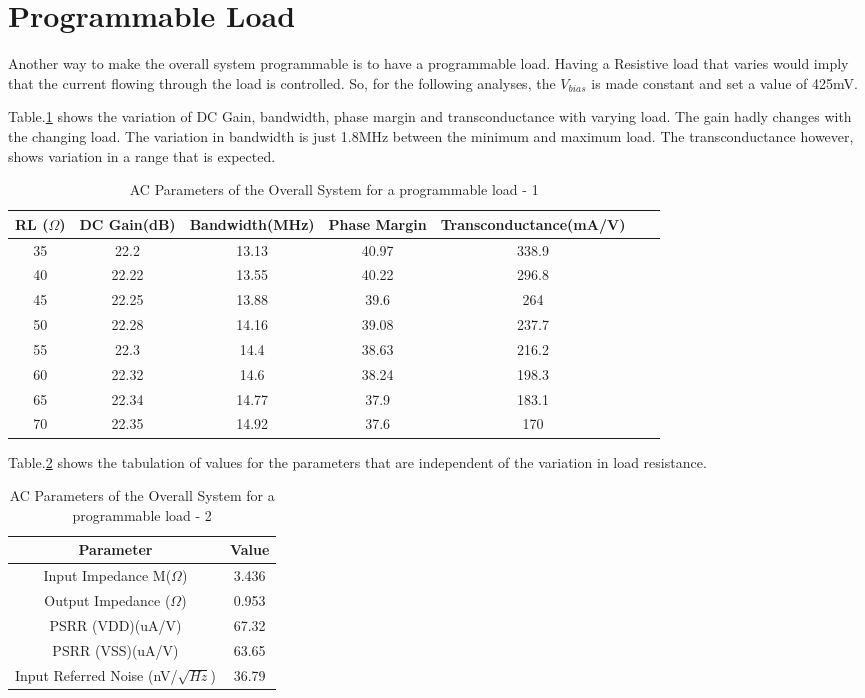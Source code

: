 \section{Programmable Load}
Another way to make the overall system programmable is to have a programmable load. Having a Resistive load that varies would imply that the current flowing through the load is controlled. So, for the following analyses, the $V_{bias}$ is made constant and set a value of 425mV.

Table.\ref{tab:RL_AC_1} shows the variation of DC Gain, bandwidth, phase margin and transconductance with varying load. The gain hadly changes with the changing load. The variation in bandwidth is just 1.8MHz between the minimum and maximum load. The transconductance however, shows variation in a range that is expected.
 
\begin{table} [H]
\centering
\begin{tabular}{@{}ccccccc@{}}
\toprule
RL ($\Omega$)		& DC Gain(dB)		& Bandwidth(MHz)		& Phase Margin			& Transconductance(mA/V)\\ \midrule
35		& 22.2 		& 13.13		& 40.97		& 338.9		\\
40		& 22.22 	& 13.55		& 40.22		& 296.8		\\
45		& 22.25 	& 13.88		& 39.6		& 264		\\
50		& 22.28 	& 14.16		& 39.08		& 237.7		\\
55		& 22.3 		& 14.4		& 38.63		& 216.2		\\
60		& 22.32 	& 14.6		& 38.24		& 198.3		\\
65		& 22.34 	& 14.77		& 37.9	 	& 183.1		\\
70		& 22.35 	& 14.92		& 37.6		& 170		\\
\bottomrule
\end{tabular}
\caption{AC Parameters of the Overall System for a programmable load - 1}
\label{tab:RL_AC_1}
\end{table}

Table.\ref{tab:RL_AC_2} shows the tabulation of values for the parameters that are independent of the variation in load resistance.

\begin{table} [H]
\centering
\begin{tabular}{@{}cc@{}}
\toprule
Parameter							& Value		\\ \midrule
Input Impedance M($\Omega$)			& 3.436 	\\
Output Impedance ($\Omega$)			& 0.953 	\\
PSRR (VDD)(uA/V)					& 67.32 	\\
PSRR (VSS)(uA/V)					& 63.65 	\\
Input Referred Noise (nV/$\sqrt{Hz}$)	& 36.79		\\
\bottomrule
\end{tabular}
\caption{AC Parameters of the Overall System for a programmable load - 2}
\label{tab:RL_AC_2}
\end{table}

